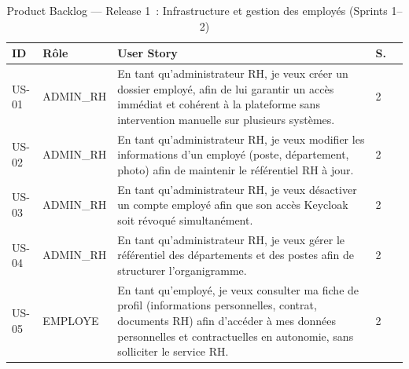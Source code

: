 \begin{table}[H]
\centering\small
\caption{Product Backlog — Release 1~: Infrastructure et gestion des employés (Sprints 1--2)}
\label{tab:backlog_r1}
\begin{tabularx}{\textwidth}{Vp{0.9cm}|p{1.8cm}|L|p{0.6cm}|}
\hline
\textbf{ID} & \textbf{Rôle} & \textbf{User Story} & \textbf{S.} \\
\hline
US-01 & ADMIN\_RH & En tant qu’administrateur RH, je veux créer un dossier employé, afin de lui garantir un accès immédiat et cohérent à la plateforme sans intervention manuelle sur plusieurs systèmes. & 2 \\
\hline
US-02 & ADMIN\_RH & En tant qu’administrateur RH, je veux modifier les informations d’un employé (poste, département, photo) afin de maintenir le référentiel RH à jour. & 2 \\
\hline
US-03 & ADMIN\_RH & En tant qu’administrateur RH, je veux désactiver un compte employé afin que son accès Keycloak soit révoqué simultanément. & 2 \\
\hline
US-04 & ADMIN\_RH & En tant qu’administrateur RH, je veux gérer le référentiel des départements et des postes afin de structurer l’organigramme. & 2 \\
\hline
US-05 & EMPLOYE & En tant qu’employé, je veux consulter ma fiche de profil (informations personnelles, contrat, documents RH) afin d’accéder à mes données personnelles et contractuelles en autonomie, sans solliciter le service RH. & 2 \\
\hline
\end{tabularx}
\end{table}
\vspace{-1em}
